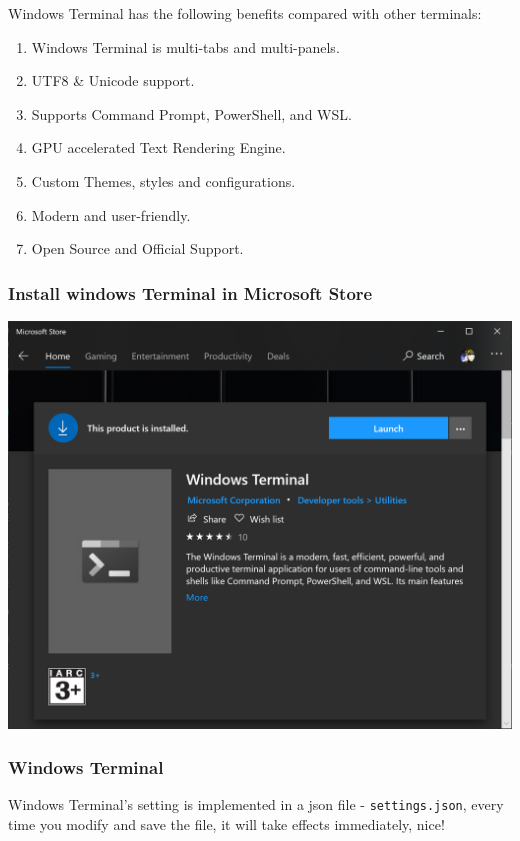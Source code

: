 \documentclass[10pt]{article}
\begin{document}
Windows Terminal has the following benefits compared with other terminals:
\begin{enumerate}
\item Windows Terminal is multi-tabs and multi-panels.
\item UTF8 \& Unicode support.
\item Supports Command Prompt, PowerShell, and WSL.
\item GPU accelerated Text Rendering Engine.
\item Custom Themes, styles and configurations.
\item Modern and user-friendly.
\item Open Source and Official Support.
\end{enumerate}

\subsubsection{Install windows Terminal in Microsoft Store}
\label{sec:org2ac4899}
\begin{center}
\includegraphics[width=.9\linewidth]{windows-terminal.png}
\end{center}

\subsubsection{Windows Terminal}
\label{sec:org197d2c1}
Windows Terminal's setting is implemented in a json file - \texttt{settings.json}, every time you modify and save the file, it will take effects immediately, nice!
\end{document}
